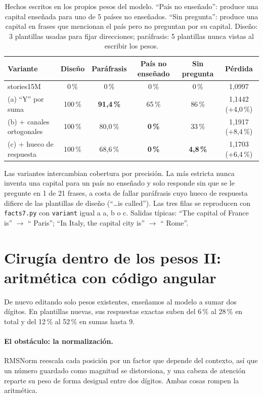 \documentclass[11pt]{article}
\begin{document}
\begin{table}[h]
\centering
\small
\setlength{\tabcolsep}{4pt}\begin{tabular}{lccccc}
\toprule
Variante & Diseño & Paráfrasis & País no enseñado & Sin pregunta & Pérdida \\
\midrule
stories15M & 0\,\% & 0\,\% & 0\,\% & 0\,\% & 1,0997 \\
(a) ``Y'' por suma & 100\,\% & \textbf{91,4\,\%} & 65\,\% & 86\,\% & 1,1442 (+4,0\,\%) \\
(b) + canales ortogonales & 100\,\% & 80,0\,\% & \textbf{0\,\%} & 33\,\% & 1,1917 (+8,4\,\%) \\
(c) + hueco de respuesta & 100\,\% & 68,6\,\% & \textbf{0\,\%} & \textbf{4,8\,\%} & 1,1703 (+6,4\,\%) \\
\bottomrule
\end{tabular}
\caption{Hechos escritos en los propios pesos del modelo. ``País no enseñado'': produce una capital enseñada para uno de 5 países no enseñados. ``Sin pregunta'': produce una capital en frases que mencionan el país pero no preguntan por su capital. Diseño: 3 plantillas usadas para fijar direcciones; paráfrasis: 5 plantillas nunca vistas al escribir los pesos.}
\end{table}

Las variantes intercambian cobertura por precisión. La más estricta nunca inventa una capital para un país no enseñado y solo responde sin que se le pregunte en 1 de 21 frases, a costa de fallar paráfrasis cuyo hueco de respuesta difiere de las plantillas de diseño (``\ldots is called''). Las tres filas se reproducen con \texttt{facts7.py} con \texttt{variant} igual a a, b o c. Salidas típicas: ``The capital of France is'' $\to$ `` Paris''; ``In Italy, the capital city is'' $\to$ `` Rome''.

\section{Cirugía dentro de los pesos II: aritmética con código angular}\label{sec:arith}
De nuevo editando solo pesos existentes, enseñamos al modelo a sumar dos dígitos. En plantillas nuevas, sus respuestas exactas suben del 6\,\% al 28\,\% en total y del 12\,\% al 52\,\% en sumas hasta 9.

\paragraph{El obstáculo: la normalización.} RMSNorm reescala cada posición por un factor que depende del contexto, así que un número guardado como magnitud se distorsiona, y una cabeza de atención reparte su peso de forma desigual entre dos dígitos. Ambas cosas rompen la aritmética.
\end{document}
